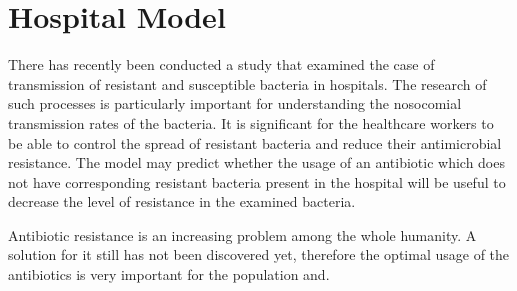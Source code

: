 \chapter*{Hospital Model}


There has recently been conducted a study that examined the case of transmission of resistant and susceptible bacteria in hospitals. The research of such processes is particularly important for understanding the nosocomial transmission rates of the bacteria. It is significant for the healthcare workers to be able to control the spread of resistant bacteria and reduce their antimicrobial resistance. The model may predict whether the usage of an antibiotic which does not have corresponding resistant bacteria present in the hospital will be useful to decrease the level of resistance in the examined bacteria.

Antibiotic resistance is an increasing problem among the whole humanity. A solution for it still has not been discovered yet, therefore the optimal usage of the antibiotics is very important for the population and.